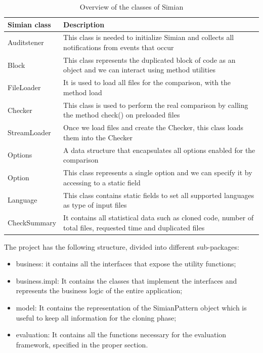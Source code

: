 
\begin{table}[!h]
	\begin{tabular}{|p{3.0cm}|p{10.4cm}|}\hline
		\textbf{Simian class} & \textbf{Description} \\\hline
		Auditstener &  This class is needed to initialize Simian and collects all notifications from events that occur \\\hline
		Block &  This class represents the duplicated block of code as an object and we can interact using method utilities \\\hline
		FileLoader &   It is used to load all files for the comparison, with the method load \\ \hline
		Checker &   This class is used to perform the real comparison by calling the method check() on preloaded files \\\hline
		StreamLoader &   Once we load files and create the Checker, this class loads them into the Checker \\\hline
		Options &   A data structure that encapsulates all options enabled for the comparison \\\hline
		Option &   This class represents a single option and we can specify it by accessing to a static field \\\hline
		Language &   This class contains static fields  to set all supported languages as type of input files \\\hline
		CheckSummary &  It contains all statistical data such as cloned code,  number of total files, requested time and duplicated files \\\hline
	\end{tabular}
	\caption{Overview of the classes of Simian}\label{Table:4}
\end{table} 

The project has the following structure, divided into different sub-packages:

\begin{itemize}
	\item business: it contains all the interfaces that expose the utility functions;
	\item business.impl: It contains the classes that implement the interfaces and represents the business logic of the entire application;
	\item model: It contains the representation of the SimianPattern object which is useful to keep all information for the cloning phase;
	\item evaluation: It contains all the functions necessary for the evaluation framework, specified in the proper section.
\end{itemize}




